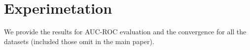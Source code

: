 \section{Experimetation}

We provide the results for AUC-ROC evaluation and the convergence for all the datasets (included those omit in the main paper).

\begin{figure}[h]
\centering
	
   \label{fig:roc}
\end{figure}


\begin{figure}[h]
\centering
	
    \label{fig:conv_entropy}
\end{figure}
